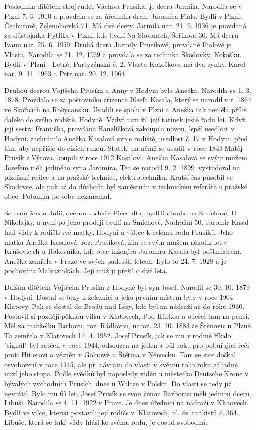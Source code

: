 \documentclass[../dejiny-rodu-prusiku.tex]{subfiles}
\begin{document}
Posledním dítětem strojvůdce Václava Prusíka, je dcera Jarmila. Narodila se v Plzni 7. 3. 1910 a provdala se za úředníka drah, Jaromíra Fialu. Bydlí v Plzni, Čechurově, Zelenohorská 71. Má dvě dcery. Jarmila nar. 21. 9. 1936 je provdaná za důstojníka Pytlíka v Plzni, kde bydlí Na Slovanech, Šeříkova 30. Má dceru Ivanu nar. 25. 6. 1959. Druhá dcera Jarmily Prusíkové, provdané Fialové je Vlasta. Narodila se 21. 12. 1939 a provdala se za technika Škodovky, Kokošku. Bydlí v Plzni - Letné, Partyzánská č. 2. Vlasta Kokoškova má dva synky. Karel nar. 9. 11. 1963 a Petr nar. 20. 12. 1964.

Druhou dcerou Vojtěcha Prusíka a Anny v Hodyni byla Anežka. Narodila se 1. 3. 1878. Provdala se za poštovního zřízence J0sefa Kasala, který se narodil v r. 1864 ve Skořicích na Rokycansku. Usadili se spolu v Plzni a Anežka tak neměla příliš daleko do svého rodiště, Hodyně. Vždyť tam žil její tatínek ještě řadu let. Když její sestra Františka, provdaná Hanzlíčková zakoupila novou, lepší usedlost v Hodyni, zachránila Anežka Kasalová svoje rodiště, usedlost č. 17 v Hodyni, před tím, aby nepřišlo do cizích rukou. Statek, na němž se usadil v roce 1843 Matěj Prusík z Výrova, koupili v roce 1912 Kasalovi. Anežka Kasalová se svým mužem Josefem měli jediného syna Jaromíra. Ten se narodil 9. 2. 1899, vystudoval na plzeňské reálce a na pražské technice, elektrotechniku. Kratší čas působil ve Škodovce, ale pak až do důchodu byl zaměstnán v technickém referátě u pražské obce. Potomků po sobe nezanechal.

Se  svou ženou Julií, dcerou sochaře Piccardta, bydlili dlouho na Smíchově, U Nikolajky, a nyní po jeho prodeji bydlí na Smíchově, Nádražní 50. Jaromír Kasal lnul vždy k rodišti své matky, Hodyni a vůbec k celému rodu Prusíků. Jeho matka Anežka Kasalová, roz. Prusíková,  žila se svým mužem několik let v Krušovicich u Rakovníka, kde otec inženýra Jaromíra Kasala byl poštmistrem. Anežka zemřela v Praze ve svých padesáti letech. Bylo to 24. 7. 1928 a je pochována Malvazinkách. Její muž ji přežil o dvě leta.

Dalším dítětem Vojtěcha Prusíka z Hodyně byl syn Josef. Narodil se 30. 10. 1879 v Hodyni. Dostal se brzy k železnici a jeho prvním místem byly v roce 1904 Klatovy. Pak se dostal do Brodu nad Lesy, kde byl na nádraží až do roku 1930. Postavil si později pěknou vilku v Klatovech, Pod Hůrkou a odešel tam na pensi. Měl za manžel­ku Barboru, roz. Rádlovou, naroz. 23. 10. 1883 ze Štěnovic u Plzně. Ta zemřela v Klatovech 17. 4. 1952. Josef Prusík, jak se mu v rodině říkalo "signál" byl zatčen v roce 1944, odsouzen na jeden a půl roku pro pobuřující řeči proti Hitlerovi a vězněn v Golnowě u Štětina v Německu. Tam se sice dočkal osvobození v roce 1945, ale při ná­vratu do vlasti v květnu toho roku záhadně mizí jeho stopa. Podle svědků byl naposledy viděn u městečka Deutsche Krone v bývalých východních Prusích, dnes u Walcze v Polsku. Do vlasti se tedy již nevrátil. Bylo mu 66 let. Josef Prusík se svou ženou Barborou měli jedinou dceru, Libuši. Narodila se 4. 11. 1922 v Praze. Je dnes úřednicí na nádraží v Klatovech. Bydlí ve vilce, kterou postavili její rodiče v Klatovech, ul. čs. tankistů č. 364. Libuše, která se také vždy hlásí ke svému rodu, je dosud svobodná.
\end{document}
